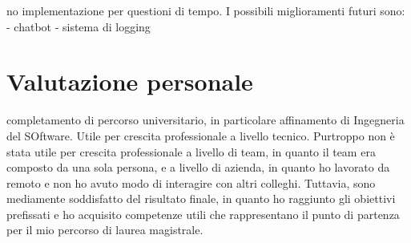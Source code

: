 no implementazione per questioni di tempo. I possibili miglioramenti futuri sono:
- chatbot
- sistema di logging


\section{Valutazione personale}

completamento di percorso universitario, in particolare affinamento di Ingegneria del SOftware.
Utile per crescita professionale a livello tecnico.
Purtroppo non è stata utile per crescita professionale a livello di team, in quanto il team era composto da una sola persona, e a livello di azienda, in quanto ho lavorato da remoto e non ho avuto modo di interagire con altri colleghi.
Tuttavia, sono mediamente soddisfatto del risultato finale, in quanto ho raggiunto gli obiettivi prefissati e ho acquisito competenze utili che
rappresentano il punto di partenza per il mio percorso di laurea magistrale.
